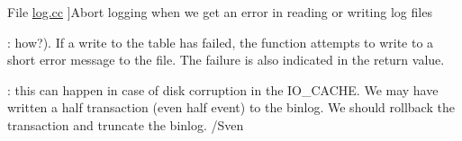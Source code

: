 \begin{DoxyRefList}
%
File \mbox{\hyperlink{log_8cc}{log.cc}} ]Abort logging when we get an error in reading or writing log files  
\item[\label{todo__todo000045}%
\Hypertarget{todo__todo000045}%
Member \mbox{\hyperlink{classLog__event__handler_aa9f98b8c0b48eb846877fe9d2496560e}{Log\+\_\+event\+\_\+handler\+:\+:log\+\_\+general}} (T\+HD $\ast$thd, ulonglong event\+\_\+utime, const char $\ast$user\+\_\+host, size\+\_\+t user\+\_\+host\+\_\+len, my\+\_\+thread\+\_\+id thread\+\_\+id, const char $\ast$command\+\_\+type, size\+\_\+t command\+\_\+type\+\_\+len, const char $\ast$sql\+\_\+text, size\+\_\+t sql\+\_\+text\+\_\+len, const C\+H\+A\+R\+S\+E\+T\+\_\+\+I\+N\+FO $\ast$client\+\_\+cs)=0]\+: how?). If a write to the table has failed, the function attempts to write to a short error message to the file. The failure is also indicated in the return value. 
\item[\label{todo__todo000006}%
\Hypertarget{todo__todo000006}%
Member \mbox{\hyperlink{group__Binary__Log_gaf81ca29b12d9e21eb2d36eee2e7a51fe}{M\+Y\+S\+Q\+L\+\_\+\+B\+I\+N\+\_\+\+L\+OG\+:\+:do\+\_\+write\+\_\+cache}} (I\+O\+\_\+\+C\+A\+C\+HE $\ast$cache, class \mbox{\hyperlink{classBinlog__event__writer}{Binlog\+\_\+event\+\_\+writer}} $\ast$writer)]\+: this can happen in case of disk corruption in the I\+O\+\_\+\+C\+A\+C\+HE. We may have written a half transaction (even half event) to the binlog. We should rollback the transaction and truncate the binlog. /\+Sven 


\end{DoxyRefList}
